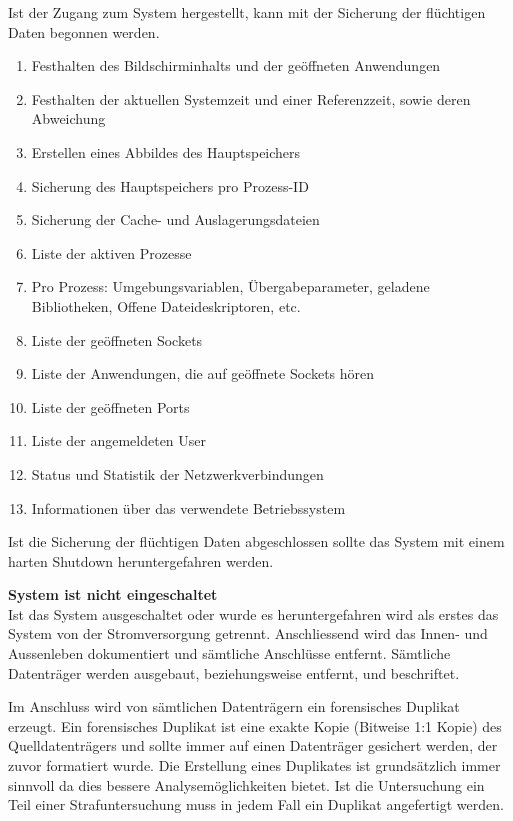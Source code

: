 Ist der Zugang zum System hergestellt, kann mit der Sicherung der flüchtigen Daten begonnen werden. 

\begin{enumerate}
\item Festhalten des Bildschirminhalts und der geöffneten Anwendungen
\item Festhalten der aktuellen Systemzeit und einer Referenzzeit, sowie deren Abweichung
\item Erstellen eines Abbildes des Hauptspeichers
\item Sicherung des Hauptspeichers pro Prozess-ID
\item Sicherung der Cache- und Auslagerungsdateien
\item Liste der aktiven Prozesse
\item Pro Prozess: Umgebungsvariablen, Übergabeparameter, geladene Bibliotheken, Offene Dateideskriptoren, etc.
\item Liste der geöffneten Sockets
\item Liste der Anwendungen, die auf geöffnete Sockets hören
\item Liste der geöffneten Ports
\item Liste der angemeldeten User
\item Status und Statistik der Netzwerkverbindungen
\item Informationen über das verwendete Betriebssystem
\end{enumerate}


Ist die Sicherung der flüchtigen Daten abgeschlossen sollte das System mit einem harten Shutdown heruntergefahren werden.


\textbf{System ist nicht eingeschaltet}\\
Ist das System ausgeschaltet oder wurde es heruntergefahren wird als erstes das System von der Stromversorgung getrennt. Anschliessend wird das Innen- und Aussenleben dokumentiert und sämtliche Anschlüsse entfernt. Sämtliche Datenträger werden ausgebaut, beziehungsweise entfernt, und beschriftet.

Im Anschluss wird von sämtlichen Datenträgern ein forensisches Duplikat erzeugt. Ein forensisches Duplikat ist eine exakte Kopie (Bitweise 1:1 Kopie) des Quelldatenträgers und sollte immer auf einen Datenträger gesichert werden, der zuvor formatiert wurde. Die Erstellung eines Duplikates ist grundsätzlich immer sinnvoll da dies bessere Analysemöglichkeiten bietet. Ist die Untersuchung ein Teil einer Strafuntersuchung muss in jedem Fall ein Duplikat angefertigt werden.

